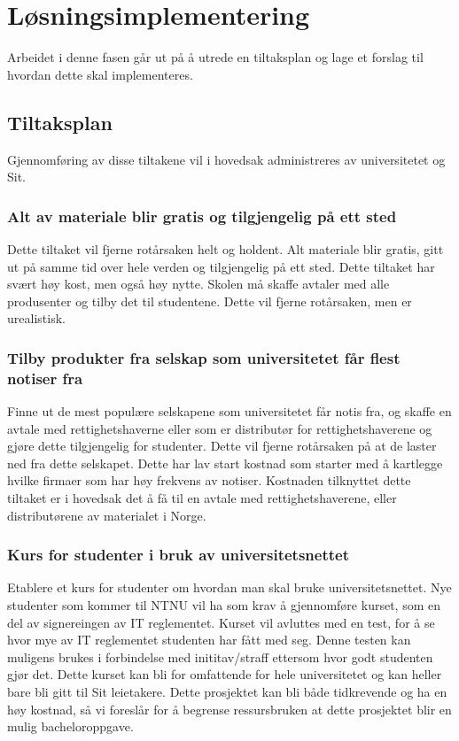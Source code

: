 \section{Løsningsimplementering}
Arbeidet i denne fasen går ut på å utrede en tiltaksplan og lage et forslag til hvordan dette skal implementeres.

\subsection{Tiltaksplan}
Gjennomføring av disse tiltakene vil i hovedsak administreres av universitetet og Sit.

\subsubsection{Alt av materiale blir gratis og tilgjengelig på ett sted}
Dette tiltaket vil fjerne rotårsaken helt og holdent. Alt materiale blir gratis, gitt ut på samme tid over hele verden og tilgjengelig på ett sted. Dette tiltaket har svært høy kost, men også høy nytte. Skolen må skaffe avtaler med alle produsenter og tilby det til studentene. Dette vil fjerne rotårsaken, men er urealistisk. 

\subsubsection{Tilby produkter fra selskap som universitetet får flest notiser fra}
Finne ut de mest populære selskapene som universitetet får notis fra, og skaffe en avtale med rettighetshaverne eller som er distributør for rettighetshaverene og gjøre dette tilgjengelig for studenter. Dette vil fjerne rotårsaken på at de laster ned fra dette selskapet. Dette har lav start kostnad som starter med å kartlegge hvilke firmaer som har høy frekvens av notiser. Kostnaden tilknyttet dette tiltaket er i hovedsak det å få til en avtale med rettighetshaverene, eller distributørene av materialet i Norge.

\subsubsection{Kurs for studenter i bruk av universitetsnettet}
Etablere et kurs for studenter om hvordan man skal bruke universitetsnettet. Nye studenter som kommer til NTNU vil ha som krav å gjennomføre kurset, som en del av signereingen av IT reglementet. Kurset vil avluttes med en test, for å se hvor mye av IT reglementet studenten har fått med seg. Denne testen kan muligens brukes i forbindelse med inititav/straff ettersom hvor godt studenten gjør det. Dette kurset kan bli for omfattende for hele universitetet og kan heller bare bli gitt til Sit leietakere. Dette prosjektet kan bli både tidkrevende og ha en høy kostnad, så vi foreslår for å begrense ressursbruken at dette prosjektet blir en mulig bacheloroppgave.   

